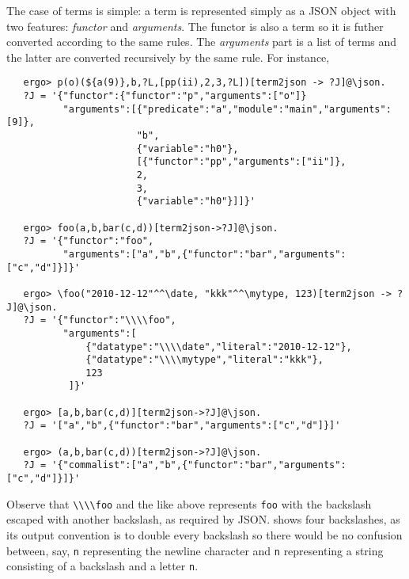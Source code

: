 The case of terms is simple: a term is represented simply as a JSON object
with two features: \emph{functor} and \emph{arguments}. The functor is also
a term so it is futher converted according to the same rules.  The
\emph{arguments} part is a list of terms and the latter are converted
recursively by the same rule. For instance,
\begin{verbatim}
   ergo> p(o)(${a(9)},b,?L,[pp(ii),2,3,?L])[term2json -> ?J]@\json.
   ?J = '{"functor":{"functor":"p","arguments":["o"]}
          "arguments":[{"predicate":"a","module":"main","arguments":[9]},
                       "b",
                       {"variable":"h0"},
                       [{"functor":"pp","arguments":["ii"]},
                       2,
                       3,
                       {"variable":"h0"}]]}'

   ergo> foo(a,b,bar(c,d))[term2json->?J]@\json.
   ?J = '{"functor":"foo",
          "arguments":["a","b",{"functor":"bar","arguments":["c","d"]}]}'

   ergo> \foo("2010-12-12"^^\date, "kkk"^^\mytype, 123)[term2json -> ?J]@\json.
   ?J = '{"functor":"\\\\foo",
          "arguments":[
              {"datatype":"\\\\date","literal":"2010-12-12"},
              {"datatype":"\\\\mytype","literal":"kkk"},
              123
           ]}'

   ergo> [a,b,bar(c,d)][term2json->?J]@\json.
   ?J = '["a","b",{"functor":"bar","arguments":["c","d"]}]'

   ergo> (a,b,bar(c,d))[term2json->?J]@\json.
   ?J = '{"commalist":["a","b",{"functor":"bar","arguments":["c","d"]}]}'
\end{verbatim}
Observe that \verb|\\\\foo| and the like above represents \texttt{\bs{}foo}
with the backslash escaped with another backslash, as required by
JSON. \ERGO shows four backslashes, as its output convention is to double
every backslash so there would be no confusion between, say,
\texttt{\bs{}n} representing the newline character and \texttt{\bs{}\bs{}n}
representing a string consisting of a backslash and a letter \texttt{n}.

